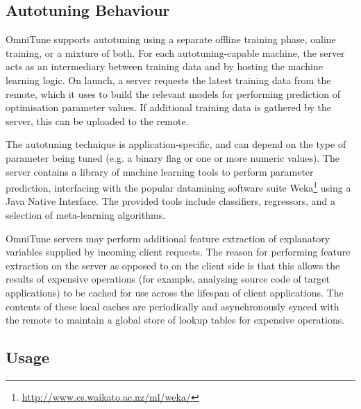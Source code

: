 \documentclass[nonatbib,preprint,9pt]{sigplanconf}
\begin{document}
\subsection{Autotuning Behaviour}

OmniTune supports autotuning using a separate offline training phase,
online training, or a mixture of both. For each autotuning-capable
machine, the server acts as an intermediary between training data and
by hosting the machine learning logic. On launch, a server requests
the latest training data from the remote, which it uses to build the
relevant models for performing prediction of optimisation parameter
values. If additional training data is gathered by the server, this
can be uploaded to the remote.

The autotuning technique is application-specific, and can depend on
the type of parameter being tuned (e.g. a binary flag or one or more
numeric values). The server contains a library of machine learning
tools to perform parameter prediction, interfacing with the popular
datamining software suite
Weka\footnote{\url{http://www.cs.waikato.ac.nz/ml/weka/}} using a Java
Native Interface. The provided tools include classifiers, regressors,
and a selection of meta-learning algorithms.

OmniTune servers may perform additional feature extraction of
explanatory variables supplied by incoming client requests. The reason
for performing feature extraction on the server as opposed to on the
client side is that this allows the results of expensive operations
(for example, analysing source code of target applications) to be
cached for use across the lifespan of client applications. The
contents of these local caches are periodically and asynchronously
synced with the remote to maintain a global store of lookup tables for
expensive operations.



\subsection{Usage}
\end{document}
